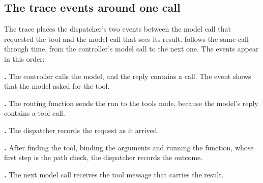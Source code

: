 \subsection{The trace events around one call}
\label{sec:dispatcher-events}

The trace places the dispatcher's two events between the model call that requested the tool and the
model call that sees its result.  follows the same 
call through time, from the controller's model call to the next one. The events appear in this
order:
\bi
\item \textbf{.} The controller calls the model, and the reply contains a
 call. The event shows that the model asked for the tool.
\item \textbf{.} The routing function sends the run to the tools node, because the
model's reply contains a tool call.
\item \textbf{.} The dispatcher records the request as it arrived.
\item \textbf{.} After finding the tool, binding the arguments and running the
function, whose first step is the path check, the dispatcher records the outcome.
\item \textbf{.} The next model call receives the tool message that carries the
result.
\ei

